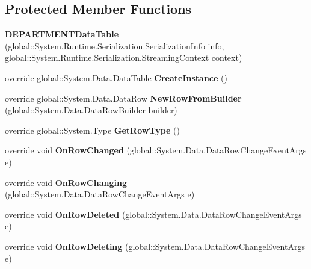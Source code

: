 \subsection*{Protected Member Functions}
\begin{CompactItemize}
\item 
\textbf{DEPARTMENTDataTable} (global::System.Runtime.Serialization.SerializationInfo info, global::System.Runtime.Serialization.StreamingContext context)\label{class_automatic_medical_system_1_1_data_set2_1_1_d_e_p_a_r_t_m_e_n_t_data_table_ea6fad8e81ddd6b516a63bf59c19044d}

\item 
override global::System.Data.DataTable \textbf{CreateInstance} ()\label{class_automatic_medical_system_1_1_data_set2_1_1_d_e_p_a_r_t_m_e_n_t_data_table_2efee71c2f13306d6a36c4e5513f43d8}

\item 
override global::System.Data.DataRow \textbf{NewRowFromBuilder} (global::System.Data.DataRowBuilder builder)\label{class_automatic_medical_system_1_1_data_set2_1_1_d_e_p_a_r_t_m_e_n_t_data_table_47468aa3606515c363a90dfb4262c52b}

\item 
override global::System.Type \textbf{GetRowType} ()\label{class_automatic_medical_system_1_1_data_set2_1_1_d_e_p_a_r_t_m_e_n_t_data_table_9cfaed9994603d15d1cc1a6236c5c707}

\item 
override void \textbf{OnRowChanged} (global::System.Data.DataRowChangeEventArgs e)\label{class_automatic_medical_system_1_1_data_set2_1_1_d_e_p_a_r_t_m_e_n_t_data_table_5e67f38e2ae2545cc2bdba9d5fb646a7}

\item 
override void \textbf{OnRowChanging} (global::System.Data.DataRowChangeEventArgs e)\label{class_automatic_medical_system_1_1_data_set2_1_1_d_e_p_a_r_t_m_e_n_t_data_table_11b5f733bbac16a16b240b248f1dec07}

\item 
override void \textbf{OnRowDeleted} (global::System.Data.DataRowChangeEventArgs e)\label{class_automatic_medical_system_1_1_data_set2_1_1_d_e_p_a_r_t_m_e_n_t_data_table_37c67ac02ce9321028b127eda296914f}

\item 
override void \textbf{OnRowDeleting} (global::System.Data.DataRowChangeEventArgs e)\label{class_automatic_medical_system_1_1_data_set2_1_1_d_e_p_a_r_t_m_e_n_t_data_table_a16585a4a13c0767852c07daea6c6e88}

\end{CompactItemize}
